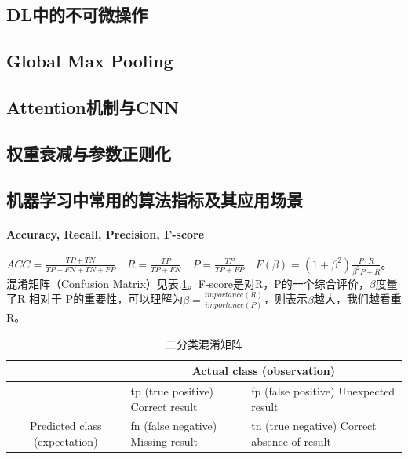 \subsection{DL中的不可微操作}

\subsection{Global Max Pooling}

\subsection{Attention机制与CNN}

\subsection{权重衰减与参数正则化}




\subsection{机器学习中常用的算法指标及其应用场景}

\paragraph{Accuracy, Recall, Precision, F-score}

$ACC = \frac{TP + TN}{TP+FN+TN+FP}\quad R = \frac{TP}{TP+FN}\quad P = \frac{TP}{TP+FP}\quad F(\beta) = (1 + \beta^2)\frac{P \cdot R}{\beta^2 P + R}$。混淆矩阵（Confusion Matrix）见表.\ref{tab:confusion_mat}。F-score是对R，P的一个综合评价，$\beta$度量了R 相对于 P的重要性，可以理解为$\beta = \frac{importance(R) }{importance(P)}$，则表示$\beta$越大，我们越看重R。

\begin{table}[h]
	\centering
	\caption{二分类混淆矩阵}
	\label{tab:confusion_mat}
	\begin{tabular}{|c|l|l|}
		\hline
		\multicolumn{1}{|l|}{}                          & \multicolumn{2}{c|}{Actual class (observation)}                                                                                   \\ \hline
		& tp (true positive) Correct result                          & fp (false positive) Unexpected result                                \\ \cline{2-3} 
		\multirow{-2}{*}{Predicted class (expectation)} & \cellcolor[HTML]{68CBD0}fn (false negative) Missing result & \cellcolor[HTML]{68CBD0}tn (true negative) Correct absence of result \\ \hline
	\end{tabular}
\end{table}

